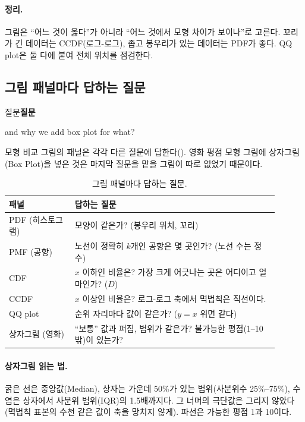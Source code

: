 \documentclass[11pt]{article}
\newenvironment{callout}[1][]
  {\par\medskip\noindent
   \begin{lrbox}{\calloutbox}\begin{minipage}{0.92\linewidth}
   \def\calloutttl{#1}\ifx\calloutttl\empty\else\textbf{#1}\par\smallskip\fi}
  {\end{minipage}\end{lrbox}%
   \fcolorbox{black!30}{black!3}{\usebox{\calloutbox}}\par\medskip}
\begin{document}
\paragraph{정리.} 그림은 ``어느 것이 옳다''가 아니라 ``어느 것에서 모형 차이가 보이나''로
고른다. 꼬리가 긴 데이터는 CCDF(로그-로그), 좁고 봉우리가 있는 데이터는 PDF가 좋다.
QQ plot은 둘 다에 붙여 전체 위치를 점검한다.

\subsection{그림 패널마다 답하는 질문}
\label{sec:panel-questions}

\begin{callout}[질문]
and why we add box plot for what?
\end{callout}

모형 비교 그림의 패널은 각각 다른 질문에 답한다(). 영화 평점 모형
그림에 상자그림(Box Plot)을 넣은 것은 마지막 질문을 맡을 그림이 따로 없었기 때문이다.

\begin{table}[H]
  \centering
  \caption{그림 패널마다 답하는 질문.}
  \label{tab:panel-questions}
  \begin{tabular}{p{0.22\linewidth}p{0.68\linewidth}}
    \toprule
    패널 & 답하는 질문 \\
    \midrule
    PDF (히스토그램) & 모양이 같은가? (봉우리 위치, 꼬리) \\
    \midrule
    PMF (공항) & 노선이 정확히 $k$개인 공항은 몇 곳인가? (노선 수는 정수) \\
    \midrule
    CDF & $x$ 이하인 비율은? 가장 크게 어긋나는 곳은 어디이고 얼마인가? ($D$) \\
    \midrule
    CCDF & $x$ 이상인 비율은? 로그-로그 축에서 멱법칙은 직선이다. \\
    \midrule
    QQ plot & 순위 자리마다 값이 같은가? ($y = x$ 위면 같다) \\
    \midrule
    상자그림 (영화) & ``보통'' 값과 퍼짐, 범위가 같은가? 불가능한 평점(1--10 밖)이 있는가? \\
    \bottomrule
  \end{tabular}
\end{table}

\paragraph{상자그림 읽는 법.} 굵은 선은 중앙값(Median), 상자는 가운데 50\%가 있는 범위(사분위수
25\%--75\%), 수염은 상자에서 사분위 범위(IQR)의 1.5배까지다. 그 너머의 극단값은 그리지 않았다
(멱법칙 표본의 수천 같은 값이 축을 망치지 않게). 파선은 가능한 평점 1과 10이다.
\end{document}
